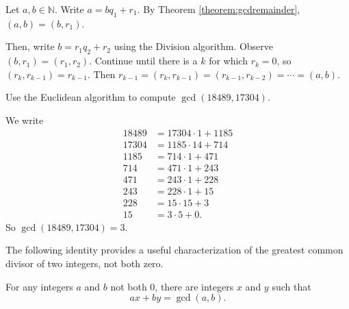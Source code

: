 \documentclass[english,course]{lecture}
\renewcommand{\le}{\leqslant}
\newenvironment{solution}[1][Solution]{\begin{trivlist}\pushQED{\qed}\item[\hskip \labelsep  \bfseries #1{}.\hspace{10pt}]}{\popQED\end{trivlist}}\renewcommand{\qedsymbol}{$\checkmark$}{\newenvironment{answer}{\renewcommand\qedsymbol{$\blacklozenge$}\begin{proof}[Answer]}{\end{proof}}}\newenvironment{answer}[1][Answer]{\begin{trivlist}\pushQED{\qed}\item[\hskip \labelsep  \bfseries #1{}.\hspace{10pt}]}{\popQED\end{trivlist}}\renewcommand{\qedsymbol}{$\lozenge$}
\newenvironment{facnote}{\startfacnote}{}
\def\startfacnote#1\end{\margintext{{\sc Note:} #1}\end}
\theoremstyle{plain}
\def\N{{\mathbb N}}
\def\presnotes{}
\begin{document}
\begin{solution}
	Let $a,b\in \N$.
	Write $a = bq_1+r_1$.
	By Theorem \ref{theorem:gcdremainder}, $(a,b) = (b,r_1)$.
	
	Then, write $b = r_1 q_2 + r_2$ using the Division algorithm.
	Observe $(b,r_1) = (r_1,r_2)$.
	Continue until there is a $k$ for which $r_k = 0$, so $(r_k,r_{k-1}) = r_{k-1}$.
	Then $r_{k-1}= (r_k, r_{k-1}) = (r_{k-1},r_{k-2}) = \cdots = (a,b)$.
\end{solution}

\presnotes

\begin{exer}
	Use the Euclidean algorithm to compute $\gcd(18489,17304)$.
\end{exer}

\begin{solution}
	We write
	\begin{align*}
		18489 &= 17304 \cdot 1 +1185\\
		17304 &= 1185\cdot 14 +714\\
		1185 &= 714 \cdot 1 + 471\\
		714 &= 471 \cdot 1+ 243\\
		471 &= 243\cdot 1 + 228\\
		243 &= 228 \cdot 1+ 15\\
		228 &= 15 \cdot 15 + 3\\
		15 &= 3\cdot 5 + 0.
	\end{align*}
	So $\gcd(18489,17304)=3$.
\end{solution}

\presnotes


The following identity provides a useful characterization of the greatest common divisor of two integers, not both zero.

\begin{theorem}\label{theorem:bezoutint}
	For any integers $a$ and $b$ not both 0, there are integers $x$ and $y$ such that
	\[
		ax + by = \gcd(a,b).
	\]
\end{theorem}
\end{document}
